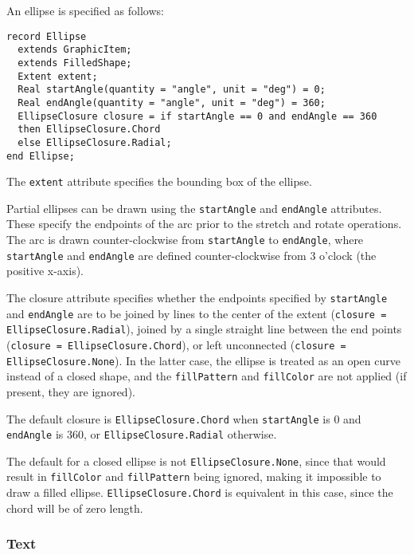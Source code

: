 An ellipse is specified as follows:
\begin{lstlisting}[language=modelica]
record Ellipse
  extends GraphicItem;
  extends FilledShape;
  Extent extent;
  Real startAngle(quantity = "angle", unit = "deg") = 0;
  Real endAngle(quantity = "angle", unit = "deg") = 360;
  EllipseClosure closure = if startAngle == 0 and endAngle == 360
  then EllipseClosure.Chord
  else EllipseClosure.Radial;
end Ellipse;
\end{lstlisting}%
The \lstinline!extent! attribute specifies the bounding box of the ellipse.

Partial ellipses can be drawn using the \lstinline!startAngle! and \lstinline!endAngle! attributes.  These specify the endpoints of the arc prior to the stretch and rotate operations.  The arc is drawn counter-clockwise from \lstinline!startAngle! to \lstinline!endAngle!, where \lstinline!startAngle! and \lstinline!endAngle! are defined counter-clockwise from 3 o'clock (the positive x-axis).

The closure attribute specifies whether the endpoints specified by \lstinline!startAngle! and \lstinline!endAngle! are to be joined by lines to the center of the extent (\lstinline!closure = EllipseClosure.Radial!), joined by a single straight line between the end points (\lstinline!closure = EllipseClosure.Chord!), or left unconnected (\lstinline!closure = EllipseClosure.None!).  In the latter case, the ellipse is treated as an open curve instead of a closed shape, and the \lstinline!fillPattern! and \lstinline!fillColor! are not applied (if present, they are ignored).

The default closure is \lstinline!EllipseClosure.Chord! when \lstinline!startAngle! is 0 and \lstinline!endAngle! is 360, or \lstinline!EllipseClosure.Radial! otherwise.

\begin{nonnormative}
The default for a closed ellipse is not \lstinline!EllipseClosure.None!, since that would result in \lstinline!fillColor!
and \lstinline!fillPattern! being ignored, making it impossible to draw a filled ellipse. \lstinline!EllipseClosure.Chord!
is equivalent in this case, since the chord will be of zero length.
\end{nonnormative}

\subsubsection{Text}\label{text}

